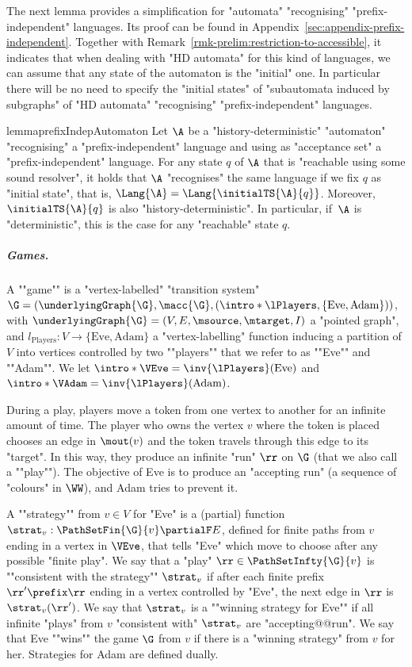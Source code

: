 \documentclass[10pt,a4paper]{amsart}
\newcommand{\Eve}{\mathrm{Eve}}
\newcommand{\Adam}{\mathrm{Adam}}
\begin{document}
The next lemma provides a simplification for "automata" "recognising" "prefix-independent" languages. Its proof can be found in Appendix~\ref{sec:appendix-prefix-independent}. Together with Remark~\ref{rmk-prelim:restriction-to-accessible}, it indicates that when dealing with "HD automata" for this kind of languages, we can assume that any state of the automaton is the "initial" one.
In particular there will be no need to specify the "initial states" of "subautomata induced by subgraphs" of "HD automata" "recognising" "prefix-independent" languages.

\begin{restatable}{lemma}{prefixIndepAutomaton}\label{lemma-prelims:prefix-indep-automaton}
	Let $\A$ be a "history-deterministic" "automaton" "recognising" a "prefix-independent" language and using as "acceptance set" a "prefix-independent" language. For any state $q$ of $\A$ that is "reachable using some sound resolver", it holds that $\A$ "recognises" the same language if we fix $q$ as "initial state", that is, $\Lang{\A} = \Lang{\initialTS{\A}{q}}$. Moreover, $\initialTS{\A}{q}$ is also "history-deterministic".  In particular, if~$\A$ is "deterministic", this is the case for any "reachable" state $q$.
\end{restatable}




\subparagraph*{Games.} \AP A ""game"" is a "vertex-labelled" "transition system" $\G = \left(\underlyingGraph{\G}, \macc{\G}, (\intro*\lPlayers, \{\Eve, \Adam\})\right)$, with $\underlyingGraph{\G} = (V,E,\msource, \mtarget, I)$ a "pointed graph", %
and $l_{\mathrm{Players}}\colon V \to \{\Eve, \Adam\}$ a "vertex-labelling" function inducing a partition of $V$ into vertices controlled by two ""players"" that we refer to as ""Eve"" and ""Adam"". We let $\intro*\VEve = \inv{\lPlayers}(\Eve)$ and $\intro*\VAdam = \inv{\lPlayers}(\Adam)$.

During a play, players move a token from one vertex to another for an infinite amount of time. %
\AP The player who owns the vertex $v$ where the token is placed chooses an edge in $\mout(v)$ and the token travels through this edge to its "target". In this way, they produce an infinite "run" $\rr$ on $\G$ (that we also call a ""play""). 
The objective of Eve is to produce an "accepting run" (a sequence of "colours" in $\WW$), and Adam tries to prevent it.


\AP A ""strategy"" from $v\in V$ for "Eve" is a (partial) function $\strat_{v}: \PathSetFin{\G}{v}  \partialF E$, defined for finite paths from $v$ ending in a vertex in $\VEve$, that tells "Eve" which move to choose after any possible "finite play".
\AP We say that a "play" $\rr\in \PathSetInfty{\G}{v}$ is ""consistent with the strategy"" $\strat_v$ if after each finite prefix $\rr' \prefix \rr$ ending in a vertex controlled by "Eve", the next edge in $\rr$ is $\strat_v(\rr')$.
\AP  We say that $\strat_v$ is a ""winning strategy for Eve"" if all infinite "plays" from $v$ "consistent with" $\strat_v$ are "accepting@@run". We say that Eve ""wins"" the game $\G$ from $v$ if there is a "winning strategy" from $v$ for her. Strategies for Adam are defined dually.
\end{document}
